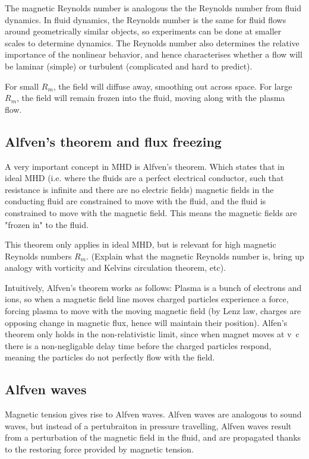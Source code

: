 \documentclass{article}
\begin{document}
The magnetic Reynolds number is analogous the the Reynolds number from fluid dynamics. In fluid dynamics, the Reynolds number is the same for fluid flows around geometrically similar objects, so experiments can be done at smaller scales to determine dynamics. The Reynolds number also determines the relative importance of the nonlinear behavior, and hence characterises whether a flow will be laminar (simple) or turbulent (complicated and hard to predict). 

For small $R_m$, the field will diffuse away, smoothing out across space. For large $R_m$, the field will remain frozen into the fluid, moving along with the plasma flow.

\subsection{Alfven's theorem and flux freezing}

A very important concept in MHD is Alfven's theorem. Which states that in ideal MHD (i.e. where the fluids are a perfect electrical conductor, such that resistance is infinite and there are no electric fields) magnetic fields in the conducting fluid are constrained to move with the fluid, and the fluid is constrained to move with the magnetic field. This means the magnetic fields are "frozen in" to the fluid. 

This theorem only applies in ideal MHD, but is relevant for high magnetic Reynolds numbers $R_m$. (Explain what the magnetic Reynolds number is, bring up analogy with vorticity and Kelvins circulation theorem, etc).

Intuitively, Alfven's theorem works as follows: Plasma is a bunch of electrons and ions, so when a magnetic field line moves charged particles experience a force, forcing plasma to move with the moving magnetic field (by Lenz law, charges are opposing change in magnetic flux, hence will maintain their position). Alfen's theorem only holds in the non-relativistic limit, since when magnet moves at v~c there is a non-negligable delay time before the charged particles respond, meaning the particles do not perfectly flow with the field.


\subsection{Alfven waves}

Magnetic tension gives rise to Alfven waves. Alfven waves are analogous to sound waves, but instead of a pertubraiton in pressure travelling, Alfven waves result from a perturbation of the magnetic field in the fluid, and are propagated thanks to the restoring force provided by magnetic tension.
\end{document}

